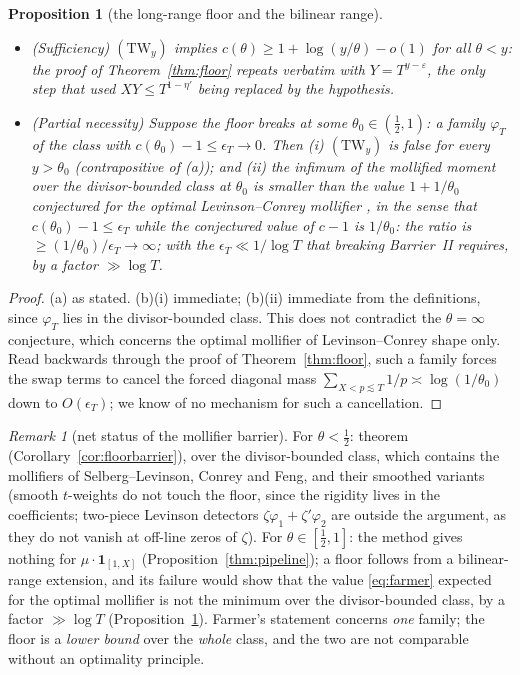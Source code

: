 \documentclass[11pt]{amsart}
\theoremstyle{plain}
\newtheorem{proposition}[theorem]{Proposition}
\theoremstyle{definition}
\theoremstyle{remark}
\newtheorem{remark}[theorem]{Remark}
\begin{document}
\begin{proposition}[the long-range floor and the bilinear range]\label{prop:sandwich}
\begin{itemize}
\item[\textup{(a)}] \textup{(}Sufficiency\textup{)} $(\mathrm{TW}_y)$ implies $c(\theta)\ge1+\log(y/\theta)-o(1)$ for all $\theta<y$: the proof of Theorem~\ref{thm:floor} repeats verbatim with $Y=T^{y-\varepsilon}$, the only step that used $XY\le T^{1-\eta'}$ being replaced by the hypothesis.
\item[\textup{(b)}] \textup{(}Partial necessity\textup{)} Suppose the floor breaks at some $\theta_0\in(\tfrac12,1)$: a family $\varphi_T$ of the class with $c(\theta_0)-1\le\epsilon_T\to0$. Then \textup{(i)} $(\mathrm{TW}_y)$ is false for every $y>\theta_0$ \textup{(}contrapositive of \textup{(a)}\textup{)}; and \textup{(ii)} the infimum of the mollified moment over the divisor-bounded class at $\theta_0$ is smaller than the value $1+1/\theta_0$ conjectured for the optimal Levinson--Conrey mollifier \cite{Farmer1993,BettinGonek2017}, in the sense that $c(\theta_0)-1\le\epsilon_T$ while the conjectured value of $c-1$ is $1/\theta_0$: the ratio is $\ge(1/\theta_0)/\epsilon_T\to\infty$; with the $\epsilon_T\ll1/\log T$ that breaking Barrier~II requires, by a factor $\gg\log T$.
\end{itemize}
\end{proposition}

\begin{proof}
(a) as stated. (b)(i) immediate; (b)(ii) immediate from the definitions, since $\varphi_T$ lies in the divisor-bounded class. This does not contradict the $\theta=\infty$ conjecture, which concerns the optimal mollifier of Levinson--Conrey shape only. Read backwards through the proof of Theorem~\ref{thm:floor}, such a family forces the swap terms to cancel the forced diagonal mass $\sum_{X<p\lesssim T}1/p\asymp\log(1/\theta_0)$ down to $O(\epsilon_T)$; we know of no mechanism for such a cancellation.
\end{proof}

\begin{remark}[net status of the mollifier barrier]\label{rem:floorstatus}
For $\theta<\tfrac12$: theorem (Corollary~\ref{cor:floorbarrier}), over the divisor-bounded class, which contains the mollifiers of Selberg--Levinson, Conrey and Feng, and their smoothed variants (smooth $t$-weights do not touch the floor, since the rigidity lives in the coefficients; two-piece Levinson detectors $\zeta\varphi_1+\zeta'\varphi_2$ are outside the argument, as they do not vanish at off-line zeros of $\zeta$). For $\theta\in[\tfrac12,1]$: the method gives nothing for $\mu\cdot\mathbf 1_{[1,X]}$ (Proposition~\ref{thm:pipeline}); a floor follows from a bilinear-range extension, and its failure would show that the value \eqref{eq:farmer} expected for the optimal mollifier is not the minimum over the divisor-bounded class, by a factor $\gg\log T$ (Proposition~\ref{prop:sandwich}). Farmer's statement concerns \emph{one} family; the floor is a \emph{lower bound} over the \emph{whole} class, and the two are not comparable without an optimality principle.
\end{remark}
\end{document}
